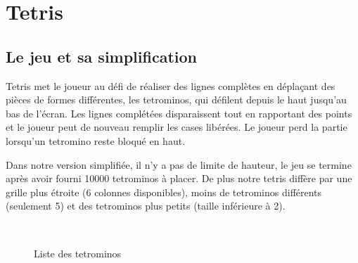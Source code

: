 \documentclass{report}
\begin{document}
\chapter{Tetris}

\section{Le jeu et sa simplification}
Tetris met le joueur au défi de réaliser des lignes complètes en déplaçant des
pièces de formes différentes, les tetrominos, qui défilent depuis le haut
jusqu'au bas de l'écran. Les lignes complétées disparaissent tout en rapportant
des points et le joueur peut de nouveau remplir les cases libérées.
Le joueur perd la partie lorsqu'un tetromino reste bloqué en haut.

Dans notre version simplifiée, il n'y a pas de limite de hauteur, le jeu se
termine après avoir fourni 10000 tetrominos à placer. De plus notre
tetris diffère par une grille plus étroite (6 colonnes disponibles), moins de
tetrominos différents (seulement 5) et des tetrominos plus petits (taille
inférieure à 2).

\begin{figure}[h]
  \centering
  \qquad
  \qquad
  \\
  \qquad
  \caption{Liste des tetrominos}\label{fig:tetrolist}
\end{figure}
\end{document}
